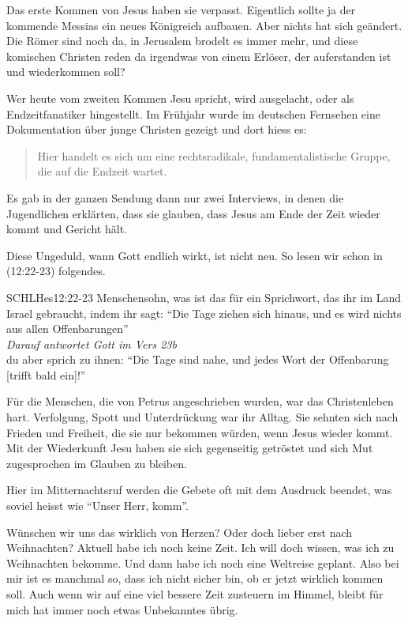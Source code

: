 \documentclass[fontsize=16pt]{mybib}
\begin{document}
Das erste Kommen von Jesus haben sie verpasst. Eigentlich sollte ja der kommende Messias ein neues Königreich aufbauen. Aber nichts hat sich geändert. Die Römer sind noch da, in Jerusalem brodelt es immer mehr, und diese komischen Christen reden da irgendwas von einem Erlöser, der auferstanden ist und wiederkommen soll?

Wer heute vom zweiten Kommen Jesu spricht, wird ausgelacht, oder als Endzeitfanatiker hingestellt. Im Frühjahr wurde im deutschen Fernsehen eine Dokumentation über junge Christen gezeigt und dort hiess es: 
\begin{quote}
  Hier handelt es sich um eine rechtsradikale, fundamentalistische Gruppe, die auf die Endzeit wartet.
\end{quote}
Es gab in der ganzen Sendung dann nur zwei Interviews, in denen die Jugendlichen erklärten, dass sie glauben, dass Jesus am Ende der Zeit wieder kommt und Gericht hält. 

Diese Ungeduld, wann Gott endlich wirkt, ist nicht neu. So lesen wir schon in (12:22-23) folgendes.
\begin{bibelbox}{SCHL}{Hes}{12:22-23}
Menschensohn, was ist das für ein Sprichwort, das ihr im Land Israel gebraucht, indem ihr sagt: \enquote{Die Tage ziehen sich hinaus, und es wird nichts aus allen Offenbarungen}\\
\textit{Darauf antwortet Gott im Vers 23b}\\
 du aber sprich zu ihnen: \enquote{Die Tage sind nahe, und jedes Wort der Offenbarung [trifft bald ein]!}
\end{bibelbox}

Für die Menschen, die von Petrus angeschrieben wurden, war das Christenleben hart. Verfolgung, Spott und Unterdrückung war ihr Alltag. Sie sehnten sich nach Frieden und Freiheit, die sie nur bekommen würden, wenn Jesus wieder kommt. Mit der Wiederkunft Jesu haben sie sich gegenseitig getröstet und sich Mut zugesprochen im Glauben zu bleiben.

Hier im Mitternachtsruf werden die Gebete oft mit dem Ausdruck  beendet, was soviel heisst wie \enquote{Unser Herr, komm}.

Wünschen wir uns das wirklich von Herzen? Oder doch lieber erst nach Weihnachten? Aktuell habe ich noch keine Zeit. Ich will doch wissen, was ich zu Weihnachten bekomme. Und dann habe ich noch eine Weltreise geplant. Also bei mir ist es manchmal so, dass ich nicht sicher bin, ob er jetzt wirklich kommen soll. Auch wenn wir auf eine viel bessere Zeit zusteuern im Himmel, bleibt für mich hat immer noch etwas Unbekanntes übrig.
\end{document}
